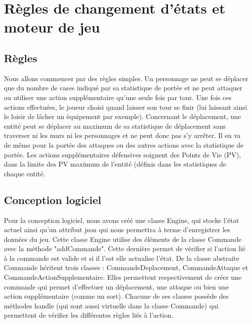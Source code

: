 \documentclass[a4paper,12pt]{article}
\begin{document}
\clearpage
\section{Règles de changement d'états et moteur de jeu}

\subsection{Règles}
Nous allons commencer par des règles simples. Un personnage ne peut se déplacer que du nombre de cases indiqué par sa statistique de portée et ne peut attaquer ou utiliser une action supplémentaire qu'une seule fois par tour. Une fois ces actions effectuées, le joueur choisi quand laisser son tour se finir (lui laissant ainsi le loisir de lâcher un équipement par exemple). Concernant le déplacement, une entité peut se déplacer au maximum de sa statistique de déplacement sans traverser ni les murs ni les personnages et ne peut donc pas s'y arrêter. Il en va de même pour la portée des attaques ou des autres actions avec la statistique de portée. Les actions supplémentaires défensives soignent des Points de Vie (PV), dans la limite des PV maximum de l'entité (définis dans les statistiques de chaque entité.

\subsection{Conception logiciel}
Pour la conception logiciel, nous avons créé une classe Engine, qui stocke l'état actuel ainsi qu'un attribut json qui nous permettra à terme d'enregistrer les données du jeu. Cette classe Engine utilise des éléments de la classe Commande avec la méthode "addCommande". Cette dernière permet de vérifier si l'action lié à la commande est valide et si il l'est elle actualise l'état. De la classe abstraite Commande héritent trois classes : CommandeDeplacement, CommandeAttaque et CommandeActionSupplementaire. Elles permettent respectivement de créer une commande qui permet d'effectuer un déplacement, une attaque ou bien une action supplémentaire (comme un sort). Chacune de ses classes possède des méthodes handle (qui sont aussi virtuelle dans la classe Commande) qui permettent de vérifier les différentes règles liés à l'action.

\end{document}
